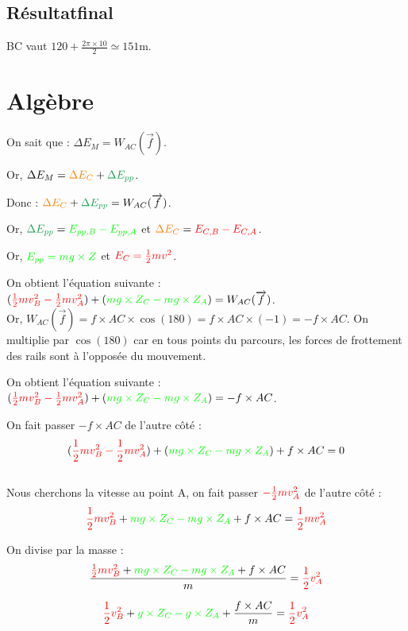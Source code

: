 \documentclass[a4paper,twoside,10pt,french]{scrartcl}
\begin{document}
\subsection{Résultat\:final}
BC vaut $120 + \frac{2\pi \times 10}{2} \simeq 151$m.
\section{Algèbre}
On sait que : $\Delta E_M = W_{AC} (\overrightarrow{f})$.

Or, $\Delta E_M = {\color{orange}\Delta E_C} + {\color{ForestGreen}\Delta E_{pp}}$.

Donc : ${\color{orange}\Delta E_C} + {\color{ForestGreen}\Delta E_{pp}} = W_{AC} (\overrightarrow{f})$.

Or, ${\color{ForestGreen}\Delta E_{pp}} = {\color{green}E_{pp, B} - E_{pp, A}}$ et ${\color{orange}\Delta E_C} = {\color{red}E_{C, B} - E_{C, A}}$.

Or, ${\color{green}E_{pp} = mg \times Z}$ et ${\color{red}E_{C} = \frac{1}{2}mv^2}$.

On obtient l'équation suivante : $({\color{red}\frac{1}{2}mv_B^2 - \frac{1}{2}mv_A^2}) + ({\color{green}mg \times Z_C - mg \times Z_A}) = W_{AC} (\overrightarrow{f})$.
\\

Or, $W_{AC} (\overrightarrow{f}) = f \times AC \times \cos(180) = f \times AC \times (-1) = -f \times AC$. On multiplie par $\cos(180)$ car en tous points du parcours, les forces de frottement des rails sont à l'opposée du mouvement.

On obtient l'équation suivante : $({\color{red}\frac{1}{2}mv_B^2 - \frac{1}{2}mv_A^2}) + ({\color{green}mg \times Z_C - mg \times Z_A}) = -f \times AC$.

On fait passer $-f \times AC$ de l'autre côté : $$({\color{red}\frac{1}{2}mv_B^2 - \frac{1}{2}mv_A^2}) + ({\color{green}mg \times Z_C - mg \times Z_A}) + f \times AC = 0$$
\\

Nous cherchons la vitesse au point A, on fait passer ${\color{red}- \frac{1}{2}mv_A^2}$ de l'autre côté : $${\color{red}\frac{1}{2}mv_B^2} + {\color{green}mg \times Z_C - mg \times Z_A} + f \times AC = {\color{red} \frac{1}{2}mv_A^2}$$

On divise par la masse : $$\frac{{\color{red}\frac{1}{2}mv_B^2} + {\color{green}mg \times Z_C - mg \times Z_A} + f \times AC}{m} = {\color{red} \frac{1}{2}v_A^2}$$

$${\color{red}\frac{1}{2}v_B^2} + {\color{green}g \times Z_C - g \times Z_A} + \frac{f \times AC}{m} = {\color{red} \frac{1}{2}v_A^2}$$
\end{document}
